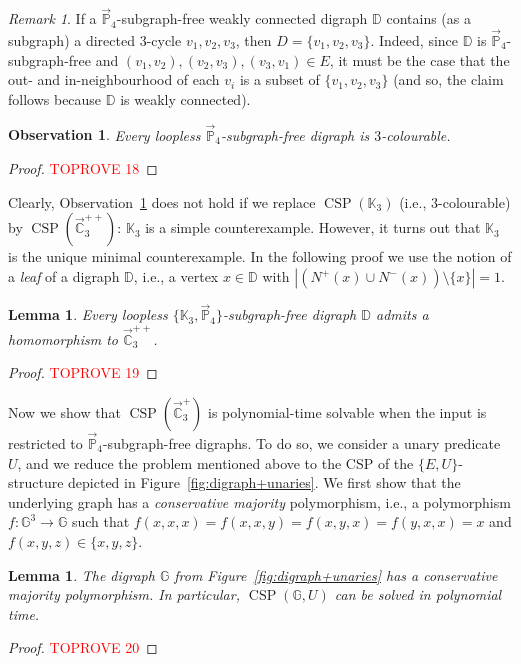 \documentclass{article}
\newtheorem{lemma}[theorem]{Lemma}
\newtheorem{observation}[theorem]{Observation}
\theoremstyle{definition}
\theoremstyle{remark}
\newtheorem{remark}[theorem]{Remark}
\DeclareMathOperator{\CSP}{CSP}
\newcommand{\bC}{{\mathbb C}}
\newcommand{\bD}{{\mathbb D}}
\newcommand{\bG}{{\mathbb G}}
\newcommand{\bK}{{\mathbb K}}
\newcommand{\bP}{{\mathbb P}}
\begin{document}
\begin{remark}\label{rmk:3-cycle}
    If a $\vec{\bP}_4$-subgraph-free weakly connected digraph $\bD$ contains
    (as a subgraph) a directed $3$-cycle $v_1,v_2,v_3$, then $D = \{v_1,v_2,v_3\}$.
    Indeed, since $\bD$ is $\vec{\bP}_4$-subgraph-free and $(v_1,v_2),(v_2,v_3),(v_3,v_1)\in E$,
    it must be the case that the out- and in-neighbourhood of each $v_i$ is a subset of
    $\{v_1,v_2,v_3\}$ (and so, the claim follows because $\bD$ is weakly connected).
\end{remark}

\begin{observation}\label{obs:K3-P4-subgraph-free}
    Every loopless $\vec{\bP}_4$-subgraph-free digraph is $3$-colourable.
\end{observation}
\begin{proof}\textcolor{red}{TOPROVE 18}\end{proof}

Clearly, Observation~\ref{obs:K3-P4-subgraph-free} does not hold if we replace $\CSP(\bK_3)$ (i.e.,
$3$-colourable) by $\CSP(\vec{\bC}_3^{++})$: $\bK_3$ is a simple counterexample. However, it turns
out that $\bK_3$ is the unique minimal counterexample. In the following proof we
use the notion of a \emph{leaf} of a digraph $\bD$, i.e., a vertex $x\in \bD$ with
$|(N^+(x)\cup N^-(x))\setminus\{x\}| = 1$.

\begin{lemma}\label{lem:C3++-P4-subgraph-free}
    Every loopless $\{\bK_3,\vec{\bP}_4\}$-subgraph-free digraph $\bD$ admits a homomorphism
    to $\vec{\bC}_3^{++}$.
\end{lemma}
\begin{proof}\textcolor{red}{TOPROVE 19}\end{proof}



Now we show that $\CSP(\vec{\bC}_3^+)$ is polynomial-time solvable when the input is restricted
to $\vec{\bP}_4$-subgraph-free digraphs. To do so, we consider a unary predicate $U$, and we
reduce the problem mentioned above to the CSP of the $\{E,U\}$-structure depicted  in 
Figure~\ref{fig:digraph+unaries}. We first show that the underlying graph has a \emph{conservative
majority} polymorphism, i.e., a polymorphism $f\colon \bG^3\to \bG$ such that $f(x,x,x) = f(x,x,y) = f(x,y,x) = f(y,x,x) = x$
and $f(x,y,z)\in \{x,y,z\}$.

\begin{lemma}\label{lem:conservative-majority}
    The digraph $\bG$ from Figure~\ref{fig:digraph+unaries} has a conservative majority polymorphism. 
    In particular, $\CSP(\bG,U)$ can be solved in polynomial time.
\end{lemma}
\begin{proof}\textcolor{red}{TOPROVE 20}\end{proof}
\end{document}
